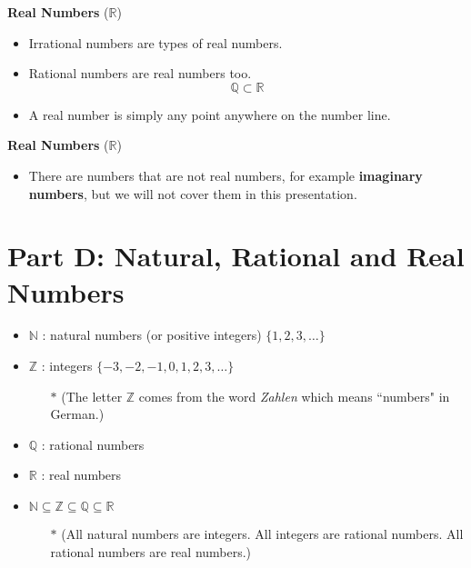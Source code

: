 \documentclass[11pt,a4paper,titlepage,oneside,openany]{article}
\numberwithin{equation}{section}
\numberwithin{algorithm}{section}
\numberwithin{figure}{section}
\numberwithin{table}{section}
\newcommand{\mb}{\mathbb}
\begin{document}
{\textbf{Real Numbers} ($\mathbb{R}$)
\begin{itemize}
\item Irrational numbers are types of real numbers.
\item Rational numbers are real numbers too.
\[ \mathbb{Q}  \subset \mathbb{R}\]

\item A real number is simply any point anywhere on the number line.
\end{itemize}


\textbf{Real Numbers} ($\mathbb{R}$)
\begin{itemize}
\item There are numbers that are not real numbers, for example \textbf{imaginary numbers}, but we will not cover them in this presentation.
\end{itemize}

\section*{Part D: Natural, Rational and Real Numbers}
\begin{framed}
\begin{itemize}
\item $\mb{N}$ : natural numbers (or positive integers) $\{1,2,3,\ldots\}$
\item $\mb{Z}$ : integers $\{-3,-2,-1,0,1,2,3,\ldots\}$
\begin{itemize}
\item[$\ast$] (The letter $\mb{Z}$ comes from the word \emph{Zahlen} which means ``numbers" in German.)
\end{itemize}
\item $\mb{Q}$ : rational numbers
\item $\mb{R}$ : real numbers
\item $\mb{N} \subseteq \mb{Z } \subseteq \mb{Q} \subseteq \mb{R}$
\begin{itemize}
\item[$\ast$] (All natural numbers are integers. All integers are rational numbers. All rational numbers are real numbers.)
\end{itemize}
\end{itemize}
\end{framed}

}
\end{document}

